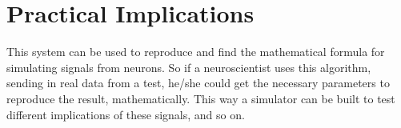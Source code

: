 \section{Practical Implications}

This system can be used to reproduce and find the mathematical formula
for simulating signals from neurons. So if a neuroscientist uses this algorithm, 
sending in real data from a test, he/she could get the necessary parameters to
reproduce the result, mathematically. This way a simulator can be built to test 
different implications of these signals, and so on. 